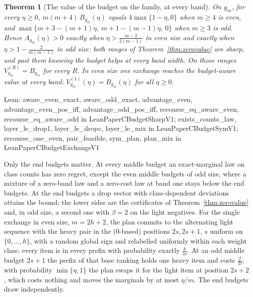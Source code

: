 \documentclass[conference]{IEEEtran}
\newtheorem{theorem}{Theorem}
\theoremstyle{definition}
\newcommand{\lean}[1]{\textsf{\footnotesize #1}}
\newcommand{\leanbox}[1]{%
  \par\vspace{2pt}\noindent
  {\raggedright\footnotesize\textsf{Lean: #1}\par}\vspace{2pt}}
\begin{document}
\begin{theorem}[The value of the budget on the family, at every band]
\label{thm:awareexact}
On $g_m$, for every $\eta\ge0$, $m(m+4)\,B_{g_m}(\eta)$ equals $4\max\{1-\eta,0\}$ when $m\ge4$ is
even, and $\max\{m+3-(m+1)\eta,\ m+1-(m-1)\eta,\ 0\}$ when $m\ge3$ is odd. Hence $A_{g_m}(\eta)>0$ exactly when $\eta>\frac{m-2}{2(m-1)}$ in even size and exactly when
$\eta>1-\frac2{m(m-1)}$ in odd size: both ranges of Theorem~\ref{thm:zerovalue} are sharp, and
past them knowing the budget helps at every band width. On those ranges $V^{(R)}_{g_m}=B_{g_m}$ for
every $R$. In even size one exchange reaches the budget-aware value at every band:
$V^{(1)}_{g_m}(\eta)=B_{g_m}(\eta)$ for all $\eta\ge0$.
\end{theorem}
\leanbox{\lean{aware\_even\_exact}, \lean{aware\_odd\_exact}, \lean{advantage\_even},
\lean{advantage\_even\_pos\_iff}, \lean{advantage\_odd\_pos\_iff}, \lean{recourse\_eq\_aware\_even},
\lean{recourse\_eq\_aware\_odd} in \lean{LeanPaperCBudgetSharpV1}; \lean{exists\_counts\_law},
\lean{layer\_le\_drop1}, \lean{layer\_le\_dropc}, \lean{layer\_le\_mix} in \lean{LeanPaperCBudgetSymV1};
\lean{recourse\_one\_even}, \lean{pair\_feasible}, \lean{sym\_plan}, \lean{plan\_mix} in
\lean{LeanPaperCBudgetExchangeV1}}

Only the end budgets matter. At every middle budget an exact-marginal law on class counts has zero
regret, except the even middle budgets of odd size, where a mixture of a zero-band law and a
zero-cost law at band one stays below the end budgets. At the end budgets a drop vector with
class-dependent deviations attains the bound; the lower sides are the certificates of
Theorem~\ref{thm:zerovalue} and, in odd size, a second one with $\beta=2$ on the light negatives.
For the single exchange in even size, $m=2h+2$, the plan commits to the alternating light
sequence with the heavy pair in the (0-based) positions $2s,2s+1$, $s$ uniform on $\{0,\dots,h\}$, with a random global
sign and relabelled uniformly within each weight class; every item is in every prefix with
probability exactly $\frac km$. At an odd middle budget $2s+1$ the prefix of that base ranking holds
one heavy item and costs $\frac2D$; with probability $\min\{\eta,1\}$ the plan swaps it for the light
item at position $2s+2$, which
costs nothing and moves the marginals by at most $\eta/m$. The end budgets draw independently.
\end{document}
